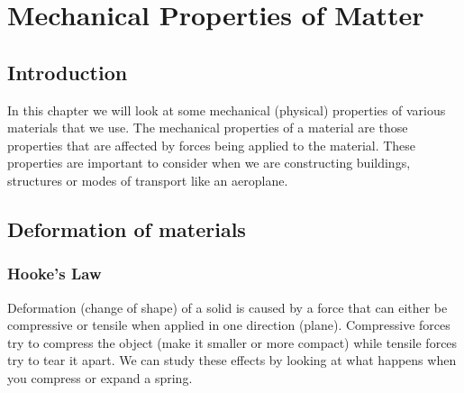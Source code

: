 \chapter{Mechanical Properties of Matter}
\label{p:mm:ep12}

\section {Introduction}

In this chapter we will look at some mechanical (physical) properties of various materials that we use. The mechanical properties of a material are those properties that are affected by forces being applied to the material. These properties are important to consider when we are constructing buildings, structures or modes of transport like an aeroplane.
  
\section{Deformation of materials}

\subsection{Hooke's Law}

Deformation (change of shape) of a solid is caused by a force that can either be compressive or tensile when applied in one direction (plane). Compressive forces try to compress the object (make it smaller or more compact) while tensile forces try to tear it apart.
We can study these effects by looking at what happens when you compress or expand a spring.
 
